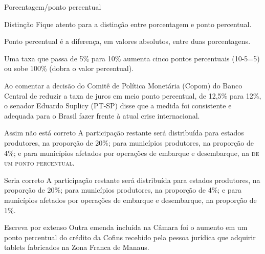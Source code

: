 \documentclass{if-beamer}
\begin{document}
\begin{frame}[allowframebreaks]{Porcentagem/ponto percentual}

    \begin{block}{Distinção}
        Fique atento para a distinção entre porcentagem e ponto percentual.

        Ponto percentual é a diferença, em valores absolutos, entre duas porcentagens.
        \framebreak

        Uma taxa que passa de 5\% para 10\% aumenta cinco pontos percentuais (10-5=5) ou sobe 100\% (dobra o valor percentual).
    \end{block}
    
    \framebreak
    
    \begin{block}{}
        Ao comentar a decisão do Comitê de Política Monetária (Copom) do Banco Central de reduzir a taxa de juros em meio 
        ponto percentual, de 12,5\% para 12\%, o senador Eduardo Suplicy (PT-SP) disse que a medida foi consistente e adequada 
        para o Brasil fazer frente à atual crise internacional. 
    \end{block}
    
    \framebreak
    
    \begin{block}{Assim não está correto}
        A participação restante será distribuída para estados produtores, na proporção de 20\%; para municípios produtores, 
        na proporção de 4\%; e para municípios afetados por operações de embarque e desembarque, na \textsc{de um ponto percentual}.     
    \end{block}
    
    \framebreak
    
    \begin{block}{Seria correto}
        A participação restante será distribuída para estados produtores, na proporção de 20\%; para municípios produtores, na 
        proporção de 4\%; e para municípios afetados por operações de embarque e desembarque, na proporção de 1\%. 
    \end{block}
    
    \framebreak
    
    \begin{block}{Escreva por extenso}
        Outra emenda incluída na Câmara foi o aumento em um ponto percentual do crédito da Cofins recebido pela pessoa jurídica 
        que adquirir tablets fabricados na Zona Franca de Manaus. 
    \end{block}
    

\end{frame}
\end{document}
